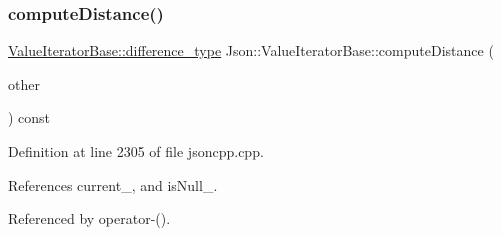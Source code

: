 \subsubsection{\texorpdfstring{compute\+Distance()}{computeDistance()}}
{\footnotesize\ttfamily \hyperlink{class_json_1_1_value_iterator_base_a4e44bf8cbd17ec8d6e2c185904a15ebd}{Value\+Iterator\+Base\+::difference\+\_\+type} Json\+::\+Value\+Iterator\+Base\+::compute\+Distance (\begin{DoxyParamCaption}\item[{const \hyperlink{class_json_1_1_value_iterator_base_a9d2a940d03ea06d20d972f41a89149ee}{Self\+Type} \&}]{other }\end{DoxyParamCaption}) const\hspace{0.3cm}{\ttfamily [protected]}}



Definition at line 2305 of file jsoncpp.\+cpp.



References current\+\_\+, and is\+Null\+\_\+.



Referenced by operator-\/().


